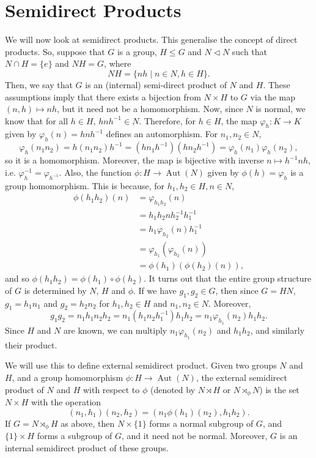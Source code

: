 \documentclass[a4paper, openany]{memoir}
\theoremstyle{definition}
\theoremstyle{plain}
\begin{document}
\section{Semidirect Products}
We will now look at semidirect products. This generalise the concept of direct products. So, suppose that $G$ is a group, $H \leqslant G$ and $N \vartriangleleft N$ such that $N \cap H = \{e\}$ and $NH = G$, where
\[NH = \{nh \mid n \in N, h \in H\}.\]
Then, we say that $G$ is an (internal) semi-direct product of $N$ and $H$. These assumptions imply that there exists a bijection from $N \times H$ to $G$ via the map $(n, h) \mapsto nh$, but it need not be a homomorphism. Now, since $N$ is normal, we know that for all $h \in H$, $hnh^{-1} \in N$. Therefore, for $h \in H$, the map $\varphi_h: K \to K$ given by $\varphi_h(n) = hnh^{-1}$ defines an automorphism. For $n_1, n_2 \in N$,
\[\varphi_h(n_1n_2) = h(n_1n_2)h^{-1} = (hn_1h^{-1})(hn_2h^{-1}) = \varphi_h(n_1) \varphi_h(n_2),\]
so it is a homomorphism. Moreover, the map is bijective with inverse $n \mapsto h^{-1}nh$, i.e. $\varphi_h^{-1} = \varphi_{h^{-1}}$. Also, the function $\phi: H \to \operatorname{Aut}(N)$ given by $\phi(h) = \varphi_h$ is a group homomorphism. This is because, for $h_1, h_2 \in H, n \in N$,
\begin{align*}
    \phi(h_1h_2)(n) &= \varphi_{h_1h_2}(n) \\
    &= h_1h_2nh_2^{-1}h_1^{-1} \\
    &= h_1 \varphi_{h_2}(n) h_1^{-1} \\
    &= \varphi_{h_1}(\varphi_{h_2}(n)) \\
    &= \phi(h_1)(\phi(h_2)(n)),
\end{align*}
and so $\phi(h_1h_2) = \phi(h_1) \circ \phi(h_2)$. It turns out that the entire group structure of $G$ is determined by $N$, $H$ and $\phi$. If we have $g_1, g_2 \in G$, then since $G = HN$, $g_1 = h_1n_1$ and $g_2 = h_2n_2$ for $h_1, h_2 \in H$ and $n_1, n_2 \in N$. Moreover,
\[g_1g_2 = n_1h_1n_2h_2 = n_1(h_1n_2h_1^{-1})h_1h_2 = n_1 \varphi_{h_1}(n_2) h_1h_2.\]
Since $H$ and $N$ are known, we can multiply $n_1 \varphi_{h_1}(n_2)$ and $h_1h_2$, and similarly their product.

We will use this to define external semidirect product. Given two groups $N$ and $H$, and a group homomorphism $\phi: H \to \operatorname{Aut}(N)$, the external semidirect product of $N$ and $H$ with respect to $\phi$ (denoted by $N \rtimes H$ or $N \rtimes_{\phi} N$) is the set $N \times H$ with the operation
\[(n_1, h_1)(n_2, h_2) = (n_1 \phi(h_1)(n_2), h_1h_2).\]
If $G = N \rtimes_{\phi} H$ as above, then $N \times \{1\}$ forms a normal subgroup of $G$, and $\{1\} \times H$ forms a subgroup of $G$, and it need not be normal. Moreover, $G$ is an internal semidirect product of these groups.
\end{document}

